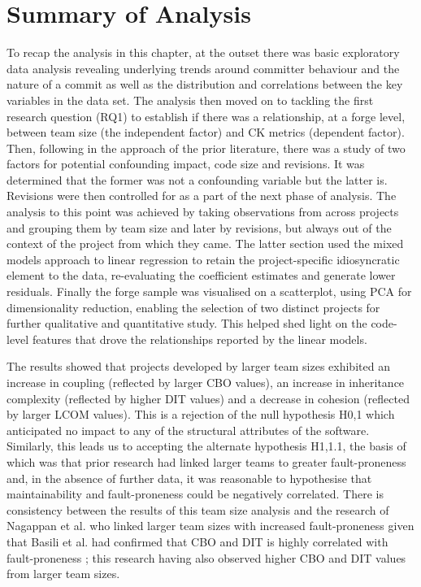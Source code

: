 \section{Summary of Analysis} %
To recap the analysis in this chapter, at the outset there was basic exploratory data analysis revealing underlying trends around committer behaviour and the nature of a commit as well as the distribution and correlations between the key variables in the data set. The analysis then moved on to tackling the first research question (RQ1) to establish if there was a relationship, at a forge level, between team size (the independent factor) and CK metrics (dependent factor). Then, following in the approach of the prior literature, there was a study of two factors for potential confounding impact, code size and revisions. It was determined that the former was not a confounding variable but the latter is. Revisions were then controlled for as a part of the next phase of analysis. The analysis to this point was achieved by taking observations from across projects and grouping them by team size and later by revisions, but always out of the context of the project from which they came. The latter section used the mixed models approach to linear regression to retain the project-specific idiosyncratic element to the data, re-evaluating the coefficient estimates and generate lower residuals. Finally the forge sample was visualised on a scatterplot, using PCA for dimensionality reduction, enabling the selection of two distinct projects for further qualitative and quantitative study. This helped shed light on the code-level features that drove the relationships reported by the linear models.

The results showed that projects developed by larger team sizes exhibited an increase in coupling (reflected by larger CBO values), an increase in inheritance complexity (reflected by higher DIT values) and a decrease in cohesion (reflected by larger LCOM values). This is a rejection of the null hypothesis H0,1 which anticipated no impact to any of the structural attributes of the software. Similarly, this leads us to accepting the alternate hypothesis H1,1.1, the basis of which was that prior research had linked larger teams to greater fault-proneness and, in the absence of further data, it was reasonable to hypothesise that maintainability and fault-proneness could be negatively correlated. There is consistency between the results of this team size analysis and the research of Nagappan et al. \citep{nagappan2008influence} who linked larger team sizes with increased fault-proneness given that Basili et al. had confirmed that CBO and DIT is highly correlated with fault-proneness \citep{basili1996validation}; this research having also observed higher CBO and DIT values from larger team sizes.

